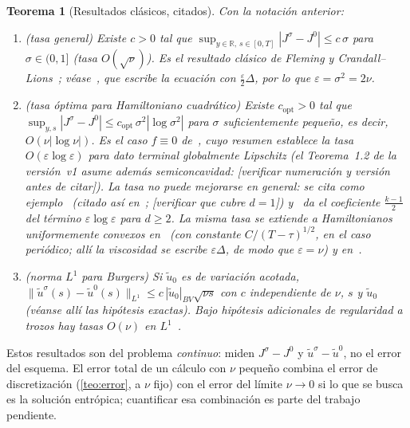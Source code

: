 \documentclass[11pt,letterpaper]{article}
\theoremstyle{plain}
\newtheorem{teorema}[theorem]{Teorema}
\theoremstyle{definition}
\theoremstyle{remark}
\numberwithin{equation}{section}
\newcommand{\R}{\mathbb{R}}
\newcommand{\norm}[1]{\lVert #1\rVert}
\newcommand{\ph}[1]{\textcolor{red!70!black}{\textit{[#1]}}}
\begin{document}
	\begin{teorema}[Resultados clásicos, citados]\label{teo:cl}
		Con la notación anterior:
		\begin{enumerate}[label=(\alph*)]
			\item (tasa general) Existe \(c>0\) tal que \(\sup_{y\in\R,\,s\in[0,T]}|J^\sigma-J^0|\le c\,\sigma\) para \(\sigma\in(0,1]\) (tasa \(O(\sqrt\nu)\)). Es el resultado clásico de Fleming y Crandall--Lions~\cite{Fleming1964,CrandallLions1984}; véase~\cite[Teorema~1.1]{ChaintronDaudin2025}, que escribe la ecuación con \(\frac\varepsilon2\Delta\), por lo que \(\varepsilon=\sigma^2=2\nu\).
			\item (tasa óptima para Hamiltoniano cuadrático) Existe \(c_{\mathrm{opt}}>0\) tal que \(\sup_{y,s}|J^\sigma-J^0|\le c_{\mathrm{opt}}\,\sigma^2|\log\sigma^2|\) para \(\sigma\) suficientemente pequeño, es decir, \(O(\nu|\log\nu|)\). Es el caso \(f\equiv0\) de~\cite{ChaintronDaudin2025}, cuyo resumen establece la tasa \(O(\varepsilon\log\varepsilon)\) para dato terminal globalmente Lipschitz (el Teorema~1.2 de la versión~v1 asume además semiconcavidad: \ph{verificar numeración y versión antes de citar}). La tasa no puede mejorarse en general: se cita como ejemplo~\cite[Prop.~4.4]{QSTY2024} (citado así en~\cite{ChaintronDaudin2025,CirantGoffi2025}; \ph{verificar que cubre \(d=1\)}) y~\cite[Prop.~3.1]{ChaintronDaudin2025} da el coeficiente \(\frac{k-1}2\) del término \(\varepsilon\log\varepsilon\) para \(d\ge2\). La misma tasa se extiende a Hamiltonianos uniformemente convexos en~\cite[Teorema~4.1]{CirantGoffi2025} (con constante \(C/(T-\tau)^{1/2}\), en el caso periódico; allí la viscosidad se escribe \(\varepsilon\Delta\), de modo que \(\varepsilon=\nu\)) y en~\cite{ChaintronDaudin2025b}.
			\item (norma \(L^1\) para Burgers) Si \(\tilde u_0\) es de variación acotada, \(\norm{\tilde u^\sigma(s)-\tilde u^0(s)}_{L^1}\le c\,|\tilde u_0|_{BV}\sqrt{\nu s}\) con \(c\) independiente de \(\nu\), \(s\) y \(\tilde u_0\)~\cite{Kuznetsov1976,BouchutPerthame1998} (véanse allí las hipótesis exactas). Bajo hipótesis adicionales de regularidad a trozos hay tasas \(O(\nu)\) en \(L^1\)~\cite[Teor.~3.1]{Wang1999}.
		\end{enumerate}
	\end{teorema}
	
	Estos resultados son del problema \emph{continuo}: miden \(J^\sigma-J^0\) y \(\tilde u^\sigma-\tilde u^0\), no el error del esquema. El error total de un cálculo con \(\nu\) pequeño combina el error de discretización (\cref{teo:error}, a \(\nu\) fijo) con el error del límite \(\nu\to0\) si lo que se busca es la solución entrópica; cuantificar esa combinación es parte del trabajo pendiente.
	
\end{document}
